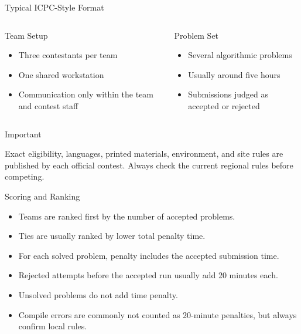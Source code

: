 \documentclass[aspectratio=169,11pt]{beamer}
\newenvironment{cpbox}[1]{%
  \begin{block}{#1}
  }{%
  \end{block}
}
\newcommand{\rulecard}[2]{%
  \begin{cpbox}{#1}
    #2
  \end{cpbox}
}
\begin{document}
\begin{frame}{Typical ICPC-Style Format}
  \begin{columns}[T,onlytextwidth]
      \rulecard{Team Setup}{
        \begin{itemize}
          \item Three contestants per team
          \item One shared workstation
          \item Communication only within the team and contest staff
        \end{itemize}
      }

      \rulecard{Problem Set}{
        \begin{itemize}
          \item Several algorithmic problems
          \item Usually around five hours
          \item Submissions judged as accepted or rejected
        \end{itemize}
      }
  \end{columns}

  \vspace{0.25cm}
  \begin{cpbox}{Important}
    Exact eligibility, languages, printed materials, environment, and site rules are published by each official contest. Always check the current regional rules before competing.
  \end{cpbox}
\end{frame}

\begin{frame}{Scoring and Ranking}
  \begin{itemize}
    \item Teams are ranked first by the number of accepted problems.
    \item Ties are usually ranked by lower total penalty time.
    \item For each solved problem, penalty includes the accepted submission time.
    \item Rejected attempts before the accepted run usually add 20 minutes each.
    \item Unsolved problems do not add time penalty.
    \item Compile errors are commonly not counted as 20-minute penalties, but always confirm local rules.
  \end{itemize}
\end{frame}
\end{document}
